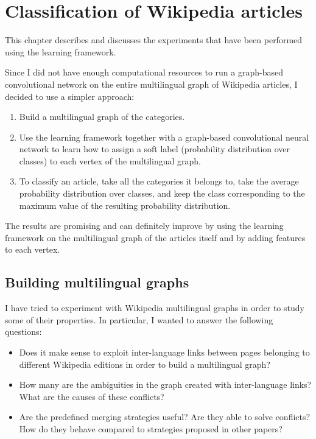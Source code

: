 \chapter{Classification of Wikipedia articles}\label{experiments_chapter}
    This chapter describes and discusses the experiments that have been performed using the learning framework.
    
    Since I did not have enough computational resources to run a graph-based convolutional network on the entire multilingual graph of Wikipedia articles, I decided to use a simpler approach:
    \begin{enumerate}
        \item Build a multilingual graph of the categories.
        \item Use the learning framework together with a graph-based convolutional neural network to learn how to assign a soft label (probability distribution over classes) to each vertex of the multilingual graph.
        \item To classify an article, take all the categories it belongs to, take the average probability distribution over classes, and keep the class corresponding to the maximum value of the resulting probability distribution.
    \end{enumerate}
    The results are promising and can definitely improve by using the learning framework on the multilingual graph of the articles itself and by adding features to each vertex.
    \section{Building multilingual graphs}
        I have tried to experiment with Wikipedia multilingual graphs in order to study some of their properties. In particular, I wanted to answer the following questions:
        \begin{itemize}
            \item Does it make sense to exploit inter-language links between pages belonging to different Wikipedia editions in order to build a multilingual graph?
            \item How many are the ambiguities in the graph created with inter-language links? What are the causes of these conflicts?
            \item Are the predefined merging strategies useful? Are they able to solve conflicts? How do they behave compared to strategies proposed in other papers?
        \end{itemize}
        
